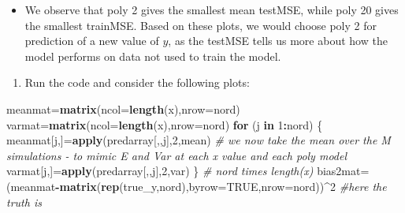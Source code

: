 \documentclass[]{article}
\newenvironment{Shaded}{\begin{snugshade}}{\end{snugshade}}
\newcommand{\CommentTok}[1]{\textcolor[rgb]{0.56,0.35,0.01}{\textit{#1}}}
\newcommand{\ControlFlowTok}[1]{\textcolor[rgb]{0.13,0.29,0.53}{\textbf{#1}}}
\newcommand{\DataTypeTok}[1]{\textcolor[rgb]{0.13,0.29,0.53}{#1}}
\newcommand{\DecValTok}[1]{\textcolor[rgb]{0.00,0.00,0.81}{#1}}
\newcommand{\KeywordTok}[1]{\textcolor[rgb]{0.13,0.29,0.53}{\textbf{#1}}}
\newcommand{\NormalTok}[1]{#1}
\newcommand{\OperatorTok}[1]{\textcolor[rgb]{0.81,0.36,0.00}{\textbf{#1}}}
\newcommand{\OtherTok}[1]{\textcolor[rgb]{0.56,0.35,0.01}{#1}}
\providecommand{\tightlist}{%
  \setlength{\itemsep}{0pt}\setlength{\parskip}{0pt}}
\begin{document}
\begin{itemize}
\tightlist
\item
  We observe that poly 2 gives the smallest mean testMSE, while poly 20
  gives the smallest trainMSE. Based on these plots, we would choose
  poly 2 for prediction of a new value of \(y\), as the testMSE tells us
  more about how the model performs on data not used to train the model.
\end{itemize}

\begin{enumerate}
\def\labelenumi{\alph{enumi})}
\setcounter{enumi}{2}
\tightlist
\item
  Run the code and consider the following plots:
\end{enumerate}

\begin{Shaded}
\begin{Highlighting}[]
\NormalTok{meanmat=}\KeywordTok{matrix}\NormalTok{(}\DataTypeTok{ncol=}\KeywordTok{length}\NormalTok{(x),}\DataTypeTok{nrow=}\NormalTok{nord)}
\NormalTok{varmat=}\KeywordTok{matrix}\NormalTok{(}\DataTypeTok{ncol=}\KeywordTok{length}\NormalTok{(x),}\DataTypeTok{nrow=}\NormalTok{nord)}
\ControlFlowTok{for}\NormalTok{ (j }\ControlFlowTok{in} \DecValTok{1}\OperatorTok{:}\NormalTok{nord)}
\NormalTok{\{}
\NormalTok{  meanmat[j,]=}\KeywordTok{apply}\NormalTok{(predarray[,,j],}\DecValTok{2}\NormalTok{,mean) }\CommentTok{# we now take the mean over the M simulations - to mimic E and Var at each x value and each poly model}
\NormalTok{  varmat[j,]=}\KeywordTok{apply}\NormalTok{(predarray[,,j],}\DecValTok{2}\NormalTok{,var)}
\NormalTok{\}}
\CommentTok{# nord times length(x)}
\NormalTok{bias2mat=(meanmat}\OperatorTok{-}\KeywordTok{matrix}\NormalTok{(}\KeywordTok{rep}\NormalTok{(true_y,nord),}\DataTypeTok{byrow=}\OtherTok{TRUE}\NormalTok{,}\DataTypeTok{nrow=}\NormalTok{nord))}\OperatorTok{^}\DecValTok{2} \CommentTok{#here the truth is}


\end{Highlighting}
\end{Shaded}
\end{document}
